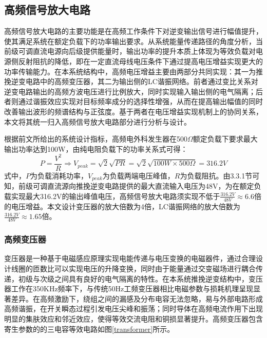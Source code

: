 \subsection{高频信号放大电路}
高频信号放大电路的主要功能是在高频工作条件下对逆变输出信号进行幅值提升，使其满足系统在额定负载下的功率输出要求。从系统能量传递路径的角度分析，当前级可调直流电源向后级提供能量时，输出功率的提升本质上体现为等效负载对电源侧反射阻抗的降低，即在一定直流母线电压条件下通过提高电压增益实现更大的功率传输能力。在本系统结构中，高频电压增益主要由两部分共同实现：其一为推挽逆变电路中的高频变压器，其二为输出侧的LC谐振网络。前者通过变比关系对逆变电路输出的高频方波电压进行比例放大，同时实现输入输出侧的电气隔离；后者则通过谐振效应实现对目标频率成分的选择性增强，从而在提高输出幅值的同时改善输出波形的频谱结构与正弦度。基于两者在电压增益实现机制上的协同关系，本文将其统一归入高频信号放大电路部分进行分析与设计。

根据前文所给出的系统设计指标，高频电外科发生器在500$\Omega$额定负载下要求最大输出功率达到100W，由纯电阻负载下的功率关系式可得：
\begin{equation}
	P = \frac{V^2}{R} \Rightarrow V_{peak} =\sqrt{2}\sqrt{PR} = \sqrt{2}\sqrt{100W\times 500\Omega} = 316.2V
\end{equation}
式中，$P$为负载消耗功率，$V_{peak}$为负载两端电压峰值，$R$为负载阻抗。由3.3.1节可知，前级可调直流源向推挽逆变电路提供的最大直流输入电压为48V，为在额定负载实现最大316.2V的输出峰值电压，高频信号放大电路须实现不低于$\frac{316.2V}{48V} \approx 6.6$倍的电压增益。本文设计变压器的放大倍数为4倍，LC谐振网络的放大倍数为$\frac{316.2V}{48V}\approx 1.65$倍。

\subsubsection{高频变压器}
变压器是一种基于电磁感应原理实现电能传递与电压变换的电磁器件，通过合理设计线圈的匝数比可以实现电压的升降变换，同时由于能量通过交变磁场进行耦合传递，初级与次级之间具有良好的电气隔离的特性。在本系统推挽逆变结构中，变压器工作在350KHz频率下，与传统50Hz工频变压器相比电磁参数与损耗机理呈现显著差异。在高频激励下，绕组之间的漏感及分布电容无法忽略，易与外部电路形成高频谐振，在开关瞬态过程引发电压尖峰和振荡；同时导体在高频电流作用下出现明显的集肤效应和邻近效应，使得等效交流电阻和铜损显著提升。高频变压器包含寄生参数的的三电容等效电路如图\ref{transformer}所示\cite{YangYang_gaopinbianyaqifenbucanshumoxingjianlijiqiceshifangfayanjiu_2016}。

